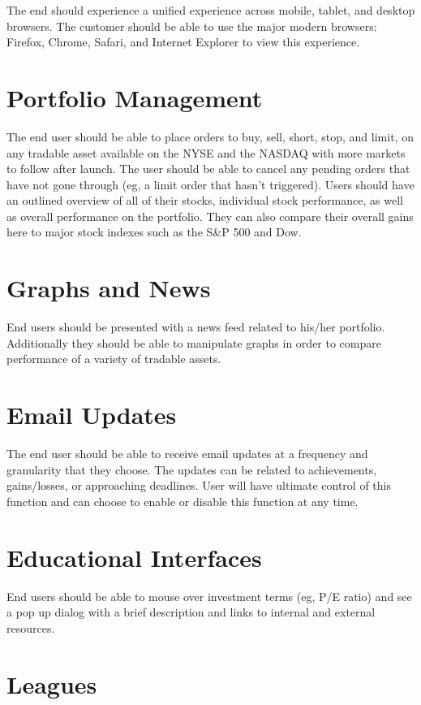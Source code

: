 \documentclass[11pt,letterpaper,oneside]{memoir}
\begin{document}
The end should experience a unified experience across mobile, tablet, and desktop browsers.
The customer should be able to use the major modern browsers: Firefox, Chrome, Safari, and
Internet Explorer to view this experience.

\section{Portfolio Management}

The end user should be able to place orders to buy, sell, short, stop, and limit, on any
tradable asset available on the NYSE and the NASDAQ with more markets to follow
after launch. The user should be able to cancel any pending orders that have not
gone through (eg, a limit order that hasn't triggered).  Users should have an
outlined overview of all of their stocks, individual stock performance, as well
as overall performance on the portfolio. They can also compare their overall
gains here to major stock indexes such as the S\&P 500 and Dow.

\section{Graphs and News}

End users should be presented with a news feed related to his/her portfolio.
Additionally they should be able to manipulate graphs in order to compare
performance of a variety of tradable assets.

\section{Email Updates}

The end user should be able to receive email updates at a frequency and
granularity that they choose.  The updates can be related to achievements,
gains/losses, or approaching deadlines. User will have ultimate control of this
function and can choose to enable or disable this function at any time.

\section{Educational Interfaces}

End users should be able to mouse over investment terms (eg, P/E ratio) and see a pop up
dialog with a brief description and links to internal and external resources.

\section{Leagues}
\end{document}
